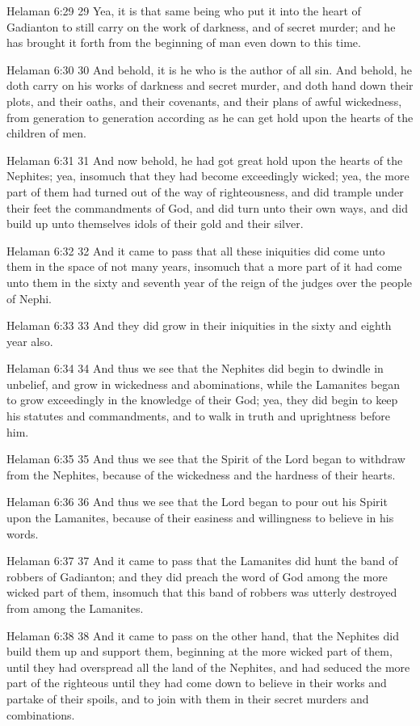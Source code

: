 Helaman 6:29
 29 Yea, it is that same being who put it into the heart of
Gadianton to still carry on the work of darkness, and of secret
murder; and he has brought it forth from the beginning of man
even down to this time.

Helaman 6:30
 30 And behold, it is he who is the author of all sin. And
behold, he doth carry on his works of darkness and secret murder,
and doth hand down their plots, and their oaths, and their
covenants, and their plans of awful wickedness, from generation
to generation according as he can get hold upon the hearts of the
children of men.

Helaman 6:31
 31 And now behold, he had got great hold upon the hearts of the
Nephites; yea, insomuch that they had become exceedingly wicked;
yea, the more part of them had turned out of the way of
righteousness, and did trample under their feet the commandments
of God, and did turn unto their own ways, and did build up unto
themselves idols of their gold and their silver.

Helaman 6:32
 32 And it came to pass that all these iniquities did come unto
them in the space of not many years, insomuch that a more part of
it had come unto them in the sixty and seventh year of the reign
of the judges over the people of Nephi.

Helaman 6:33
 33 And they did grow in their iniquities in the sixty and eighth
year also.

Helaman 6:34
 34 And thus we see that the Nephites did begin to dwindle in
unbelief, and grow in wickedness and abominations, while the
Lamanites began to grow exceedingly in the knowledge of their
God; yea, they did begin to keep his statutes and commandments,
and to walk in truth and uprightness before him.

Helaman 6:35
 35 And thus we see that the Spirit of the Lord began to withdraw
from the Nephites, because of the wickedness and the hardness of
their hearts.

Helaman 6:36
 36 And thus we see that the Lord began to pour out his Spirit
upon the Lamanites, because of their easiness and willingness to
believe in his words.

Helaman 6:37
 37 And it came to pass that the Lamanites did hunt the band of
robbers of Gadianton; and they did preach the word of God among
the more wicked part of them, insomuch that this band of robbers
was utterly destroyed from among the Lamanites.

Helaman 6:38
 38 And it came to pass on the other hand, that the Nephites did
build them up and support them, beginning at the more wicked part
of them, until they had overspread all the land of the Nephites,
and had seduced the more part of the righteous until they had
come down to believe in their works and partake of their spoils,
and to join with them in their secret murders and combinations.

